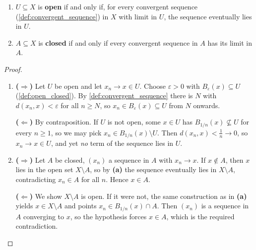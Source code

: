 \begin{proposition}
\label{prop:open_closed_via_sequences}
\begin{enumerate}[label=\textbf{(\alph*)}]
  \item $U \subseteq X$ is \textbf{open} if and only if, for every convergent sequence
    (\cref{def:convergent_sequence}) in $X$ with limit in $U$, the sequence eventually lies in
    $U$.
  \item $A \subseteq X$ is \textbf{closed} if and only if every convergent sequence in $A$ has its
    limit in $A$.
\end{enumerate}
\end{proposition}

\begin{proof}
\begin{enumerate}[label=\textbf{(\alph*)}]
  \item \textbf{($\Rightarrow$)} Let $U$ be open and let $x_n \to x \in U$. Choose
    $\varepsilon>0$ with $B_\varepsilon(x) \subseteq U$ (\cref{def:open_closed}). By
    \cref{def:convergent_sequence} there is $N$ with $d(x_n,x)<\varepsilon$ for all $n \geq N$,
    so $x_n \in B_\varepsilon(x) \subseteq U$ from $N$ onwards.

    \textbf{($\Leftarrow$)} By contraposition. If $U$ is not open, some $x \in U$ has
    $B_{1/n}(x) \not\subseteq U$ for every $n \geq 1$, so we may pick
    $x_n \in B_{1/n}(x)\setminus U$. Then $d(x_n,x) < \tfrac1n \to 0$, so $x_n \to x \in U$, and
    yet \emph{no} term of the sequence lies in $U$.
  \item \textbf{($\Rightarrow$)} Let $A$ be closed, $(x_n)$ a sequence in $A$ with $x_n \to x$.
    If $x \notin A$, then $x$ lies in the open set $X\setminus A$, so by \textbf{(a)} the
    sequence eventually lies in $X\setminus A$, contradicting $x_n \in A$ for all $n$. Hence
    $x \in A$.

    \textbf{($\Leftarrow$)} We show $X\setminus A$ is open. If it were not, the same
    construction as in \textbf{(a)} yields $x \in X\setminus A$ and points
    $x_n \in B_{1/n}(x) \cap A$. Then $(x_n)$ is a sequence in $A$ converging to $x$, so the
    hypothesis forces $x \in A$, which is the required contradiction.
\end{enumerate}
\end{proof}

